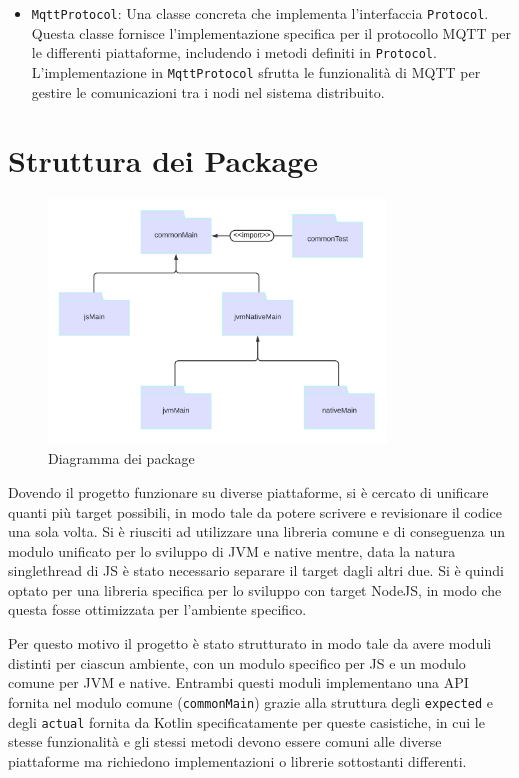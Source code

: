 \documentclass[12pt,a4paper,openright,twoside]{book}
\begin{document}
\begin{itemize}
    \item \texttt{MqttProtocol}: Una classe concreta che implementa l'interfaccia \texttt{Protocol}. Questa classe fornisce l'implementazione 
    specifica per il protocollo MQTT per le differenti piattaforme, includendo i metodi definiti in \texttt{Protocol}.
    L'implementazione in \texttt{MqttProtocol} sfrutta le funzionalità di \ac{MQTT} per gestire le comunicazioni tra i nodi nel sistema distribuito.

\end{itemize}

\section{Struttura dei Package}
\begin{figure}[H]
    \centering
    \includegraphics[width=0.8\textwidth]{figures/package-diagram.png}
    \caption{Diagramma dei package}
    \label{fig:diagramma-package}
\end{figure}

Dovendo il progetto funzionare su diverse piattaforme, si è cercato di unificare quanti più target possibili, in modo tale da potere scrivere e revisionare il codice una sola volta.
Si è riusciti ad utilizzare una libreria comune e di conseguenza un modulo unificato per lo sviluppo di \ac{JVM} e native 
mentre, data la natura singlethread di \ac{JS} è stato necessario separare il target dagli altri due. Si è quindi optato per una libreria specifica 
per lo sviluppo con target NodeJS, in modo che questa fosse ottimizzata per l'ambiente specifico. 

Per questo motivo il progetto è stato strutturato in modo tale da avere moduli distinti per ciascun ambiente, con un modulo specifico per \ac{JS} 
e un modulo comune per \ac{JVM} e native. Entrambi questi moduli implementano una API fornita nel modulo comune (\texttt{commonMain}) grazie
alla struttura degli \texttt{expected} e degli \texttt{actual} fornita da Kotlin specificatamente per queste casistiche, in cui le stesse funzionalità
e gli stessi metodi devono essere comuni alle diverse piattaforme ma richiedono implementazioni o librerie sottostanti differenti.
\end{document}
